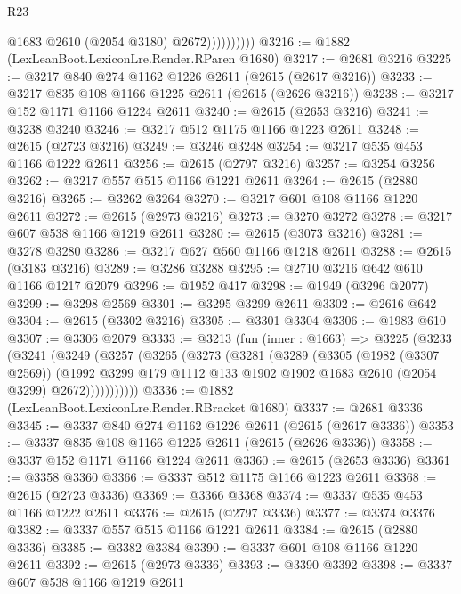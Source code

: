 \begin{lexlean}{R23}
\begin{coremodule}
                        @1683
                        @2610
                        (@2054 @3180)
                        @2672))))))))))
@3216 := @1882 (LexLeanBoot.LexiconLre.Render.RParen @1680)
@3217 := @2681 @3216
@3225 := @3217 @840 @274 @1162 @1226 @2611 (@2615 (@2617 @3216))
@3233 := @3217 @835 @108 @1166 @1225 @2611 (@2615 (@2626 @3216))
@3238 := @3217 @152 @1171 @1166 @1224 @2611
@3240 := @2615 (@2653 @3216)
@3241 := @3238 @3240
@3246 := @3217 @512 @1175 @1166 @1223 @2611
@3248 := @2615 (@2723 @3216)
@3249 := @3246 @3248
@3254 := @3217 @535 @453 @1166 @1222 @2611
@3256 := @2615 (@2797 @3216)
@3257 := @3254 @3256
@3262 := @3217 @557 @515 @1166 @1221 @2611
@3264 := @2615 (@2880 @3216)
@3265 := @3262 @3264
@3270 := @3217 @601 @108 @1166 @1220 @2611
@3272 := @2615 (@2973 @3216)
@3273 := @3270 @3272
@3278 := @3217 @607 @538 @1166 @1219 @2611
@3280 := @2615 (@3073 @3216)
@3281 := @3278 @3280
@3286 := @3217 @627 @560 @1166 @1218 @2611
@3288 := @2615 (@3183 @3216)
@3289 := @3286 @3288
@3295 := @2710 @3216 @642 @610 @1166 @1217 @2079
@3296 := @1952 @417
@3298 := @1949 (@3296 @2077)
@3299 := @3298 @2569
@3301 := @3295 @3299 @2611
@3302 := @2616 @642
@3304 := @2615 (@3302 @3216)
@3305 := @3301 @3304
@3306 := @1983 @610
@3307 := @3306 @2079
@3333 := @3213
    (fun (inner : @1663) =>
    @3225
      (@3233
        (@3241
          (@3249
            (@3257
              (@3265
                (@3273
                  (@3281
                    (@3289
                      (@3305
                        (@1982 (@3307 @2569))
                        (@1992
                          @3299
                          @179
                          @1112
                          @133
                          @1902
                          @1902
                          @1683
                          @2610
                          (@2054 @3299)
                          @2672)))))))))))
@3336 := @1882 (LexLeanBoot.LexiconLre.Render.RBracket @1680)
@3337 := @2681 @3336
@3345 := @3337 @840 @274 @1162 @1226 @2611 (@2615 (@2617 @3336))
@3353 := @3337 @835 @108 @1166 @1225 @2611 (@2615 (@2626 @3336))
@3358 := @3337 @152 @1171 @1166 @1224 @2611
@3360 := @2615 (@2653 @3336)
@3361 := @3358 @3360
@3366 := @3337 @512 @1175 @1166 @1223 @2611
@3368 := @2615 (@2723 @3336)
@3369 := @3366 @3368
@3374 := @3337 @535 @453 @1166 @1222 @2611
@3376 := @2615 (@2797 @3336)
@3377 := @3374 @3376
@3382 := @3337 @557 @515 @1166 @1221 @2611
@3384 := @2615 (@2880 @3336)
@3385 := @3382 @3384
@3390 := @3337 @601 @108 @1166 @1220 @2611
@3392 := @2615 (@2973 @3336)
@3393 := @3390 @3392
@3398 := @3337 @607 @538 @1166 @1219 @2611

\end{coremodule}
\end{lexlean}
